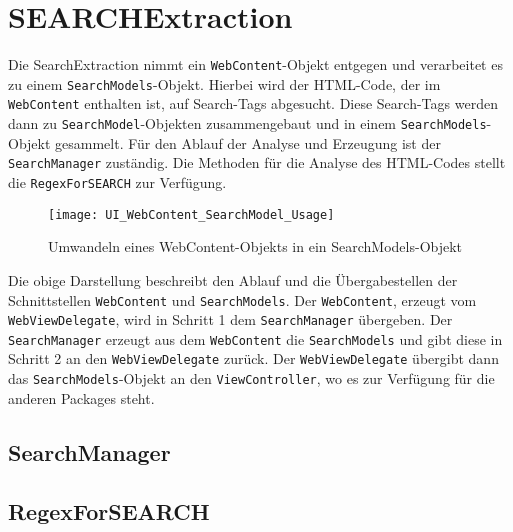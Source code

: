 
\section{SEARCHExtraction}
Die SearchExtraction nimmt ein \lstinline|WebContent|-Objekt entgegen und verarbeitet es zu einem \lstinline|SearchModels|-Objekt. Hierbei wird der HTML-Code, der im \lstinline|WebContent| enthalten ist, auf Search-Tags abgesucht. Diese Search-Tags werden dann zu \lstinline|SearchModel|-Objekten zusammengebaut und in einem \lstinline|SearchModels|-Objekt gesammelt.\newline
Für den Ablauf der Analyse und Erzeugung ist der \lstinline|SearchManager| zuständig. Die Methoden für die Analyse des HTML-Codes stellt die \lstinline|RegexForSEARCH| zur Verfügung.

\begin{figure}[h]
	\centering
	\texttt{[image: UI\_WebContent\_SearchModel\_Usage]}
	\caption{Umwandeln eines WebContent-Objekts in ein SearchModels-Objekt}
	\label{fig:WebContent zu SearchModels}
\end{figure}

Die obige Darstellung beschreibt den Ablauf und die Übergabestellen der Schnittstellen \lstinline|WebContent| und \lstinline|SearchModels|. Der \lstinline|WebContent|, erzeugt vom \lstinline|WebViewDelegate|, wird in Schritt 1 dem \lstinline|SearchManager| übergeben. Der \lstinline|SearchManager| erzeugt aus dem \lstinline|WebContent| die \lstinline|SearchModels| und gibt diese in Schritt 2 an den \lstinline|WebViewDelegate| zurück. Der \lstinline|WebViewDelegate| übergibt dann das \lstinline|SearchModels|-Objekt an den \lstinline|ViewController|, wo es zur Verfügung für die anderen Packages steht.

\subsection{SearchManager}
\subsection{RegexForSEARCH}

